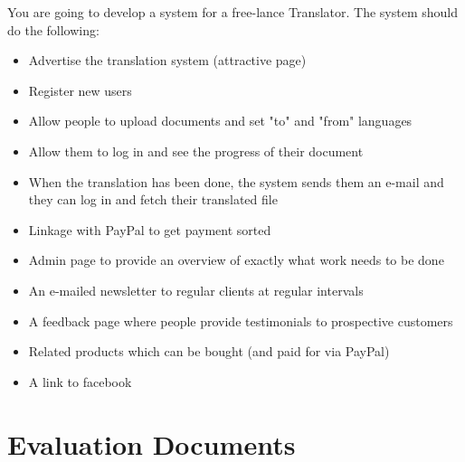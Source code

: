 \documentclass{l3proj}
\begin{document}
You are going to develop a system for a free-lance Translator. The system should do the following:

\begin{itemize}
\item{Advertise the translation system (attractive page)}
\item{Register new users}
\item{Allow people to upload documents and set "to" and "from" languages}
\item{Allow them to log in and see the progress of their document}
\item{When the translation has been done, the system sends them an e-mail and they can log in and fetch their translated file}
\item{Linkage with PayPal to get payment sorted}
\item{Admin page to provide an overview of exactly what work needs to be done}
\item{An e-mailed newsletter to regular clients at regular intervals}
\item{A feedback page where people provide testimonials to prospective customers}
\item{Related products which can be bought (and paid for via PayPal)}
\item{A link to facebook}
\end{itemize}


\chapter{Evaluation Documents}
\label{chap:eval-docs}
\end{document}
